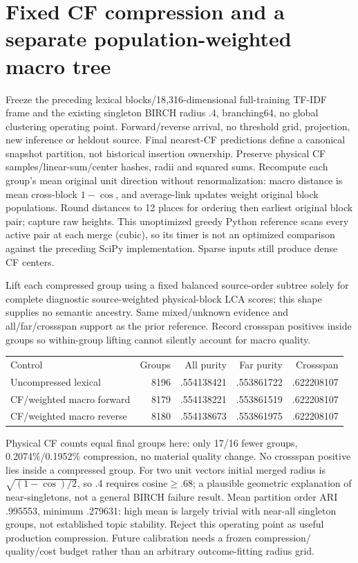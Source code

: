 \documentclass[11pt]{article}
\begin{document}
\section{Fixed CF compression and a separate population-weighted macro tree}
Freeze the preceding lexical blocks/18,316-dimensional full-training TF-IDF frame
and the existing singleton BIRCH radius .4, branching64, no global clustering
operating point\cite{birch}. Forward/reverse arrival, no threshold grid, projection,
new inference or heldout source. Final nearest-CF predictions define a canonical
snapshot partition, not historical insertion ownership. Preserve physical CF
samples/linear-sum/center hashes, radii and squared sums. Recompute each group's
mean original unit direction without renormalization: macro distance is mean
cross-block $1-\cos$, and average-link updates weight original block populations.
Round distances to 12 places for ordering then earliest original block pair;
capture raw heights. This unoptimized greedy Python reference scans every active
pair at each merge (cubic), so its timer is not an optimized comparison against
the preceding SciPy implementation. Sparse inputs still produce dense CF centers.

Lift each compressed group using a fixed balanced source-order subtree solely
for complete diagnostic source-weighted physical-block LCA scores; this shape
supplies no semantic ancestry. Same mixed/unknown evidence and all/far/crossspan
support as the prior reference. Record crossspan positives inside groups so
within-group lifting cannot silently account for macro quality.

\begin{center}\begin{tabular}{lrrrr}
Control & Groups & All purity & Far purity & Crossspan \\
Uncompressed lexical & 8196 & .554138421 & .553861722 & .622208107 \\
CF/weighted macro forward & 8179 & .554138221 & .553861519 & .622208107 \\
CF/weighted macro reverse & 8180 & .554138673 & .553861975 & .622208107
\end{tabular}\end{center}

Physical CF counts equal final groups here: only 17/16 fewer groups,
0.2074\%/0.1952\% compression, no material quality change. No crossspan positive
lies inside a compressed group. For two unit vectors initial merged radius is
$\sqrt{(1-\cos)/2}$, so .4 requires cosine$\ge.68$; a plausible geometric
explanation of near-singletons, not a general BIRCH failure result. Mean partition
order ARI .995553, minimum .279631: high mean is largely trivial with near-all
singleton groups, not established topic stability. Reject this operating point
as useful production compression. Future calibration needs a frozen compression/
quality/cost budget rather than an arbitrary outcome-fitting radius grid.
\end{document}
